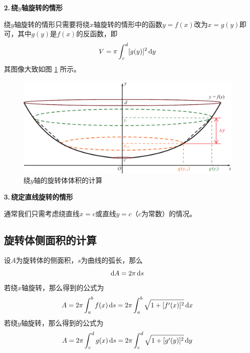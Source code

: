 \noindent \textbf{2.$\,$绕$y$轴旋转的情形}
\par 绕$y$轴旋转的情形只需要将绕$x$轴旋转的情形中的函数$y=f(x)$改为$x=g(y)$即可，其中$g(y)$是$f(x)$的反函数，即
\begin{equation}
	V=\pi\int_{c}^{d}[g(y)]^2\,{\rm{d}} y
\end{equation}
其图像大致如图 \ref{y旋转} 所示。
\begin{figure}[!htb]
	\centering
	\includegraphics[width=0.7\linewidth]{pic/C-4/y旋转体积}
	\vspace*{-1em}
	\caption{绕$y$轴的旋转体体积的计算}
	\label{y旋转}
\end{figure}

\textbf{3.$\,$绕定直线旋转的情形}
\par 通常我们只需考虑绕直线$x=c$或直线$y=c$（$c$为常数）的情况。
\subsection{旋转体侧面积的计算}
\par 设$A$为旋转体的侧面积，$s$为曲线的弧长，那么
\begin{equation}
	{\rm{d}} A=2\pi\, {\rm{d}} s
\end{equation}
若绕$x$轴旋转，那么得到的公式为
\begin{equation}
	 A=2\pi \int_{a}^{b}f(x)\,{\rm{d}} s=2\pi\int_{a}^{b}\sqrt{1+[f'(x)]^2}\,{\rm{d}} x
\end{equation}
若绕$y$轴旋转，那么得到的公式为
\begin{equation}
	A=2\pi \int_{c}^{d}g(x)\,{\rm{d}} s=2\pi\int_{c}^{d}\sqrt{1+[g'(y)]^2}\,{\rm{d}} y
\end{equation}





